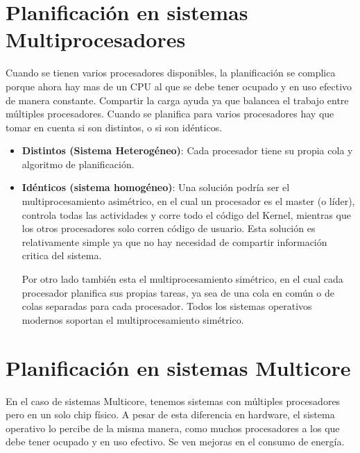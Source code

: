 \documentclass{article}
\begin{document}
{\centering \section*{Planificación en sistemas Multiprocesadores}}

Cuando se tienen varios procesadores disponibles, la planificación se complica porque ahora
hay mas de un CPU al que se debe tener ocupado y en uso efectivo de manera constante.
Compartir la carga ayuda ya que balancea el trabajo entre múltiples procesadores.
Cuando se planifica para varios procesadores hay que tomar en cuenta si son distintos, o si son idénticos.

\begin{itemize}
	\item \textbf{Distintos (Sistema Heterogéneo)}: Cada procesador tiene su propia cola y algoritmo de
	planificación.
	
	\item \textbf{Idénticos (sistema homogéneo)}: Una solución podría ser el multiprocesamiento asimétrico, en el cual
	un procesador es el master (o líder), controla todas las actividades y corre todo el código
	del Kernel, mientras que los otros procesadores solo corren código de usuario. Esta solución es
	relativamente simple ya que no hay necesidad de compartir información critica del sistema.
	
	Por otro lado también esta el multiprocesamiento simétrico, en el cual cada procesador planifica sus
	propias tareas, ya sea de una cola en común o de colas separadas para cada procesador.
	Todos los sistemas operativos modernos soportan el multiprocesamiento simétrico.
\end{itemize}



{\centering \section*{Planificación en sistemas Multicore}}

En el caso de sistemas Multicore, tenemos sistemas con múltiples procesadores pero en un solo
chip físico. A pesar de esta diferencia en hardware, el sistema operativo lo percibe de la misma manera,
como muchos procesadores a los que debe tener ocupado y en uso efectivo. Se ven mejoras en el consumo 
de energía.
\end{document}
